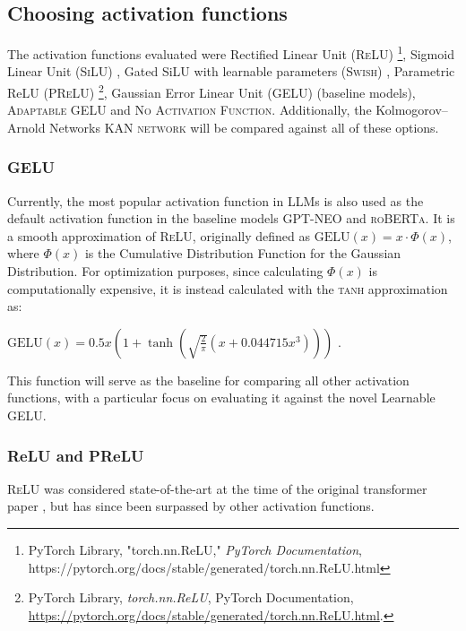 \subsection{Choosing activation functions}
The activation functions evaluated were Rectified Linear Unit (\textsc{ReLU}) \footnote{PyTorch Library, "torch.nn.ReLU," \textit{PyTorch Documentation}, https://pytorch.org/docs/stable/generated/torch.nn.ReLU.html}, Sigmoid Linear Unit (\textsc{SiLU}) \cite{Hendrycks2023}, Gated SiLU with learnable parameters (\textsc{Swish}) \cite{eger_is_2019}, Parametric ReLU (\textsc{PReLU}) \footnote{PyTorch Library, \textit{torch.nn.ReLU}, PyTorch Documentation, \url{https://pytorch.org/docs/stable/generated/torch.nn.ReLU.html}.}, Gaussian Error Linear Unit (\textsc{GELU}) (baseline models), \textsc{Adaptable GELU} and \textsc{No Activation Function}. Additionally, the Kolmogorov–Arnold Networks \textsc{KAN network} \cite{Liu2024} will be compared against all of these options.

\subsubsection{GELU}
Currently, the most popular activation function in LLMs is also used as the default activation function in the baseline models \textsc{GPT-NEO} and \textsc{roBERTa}. It is a smooth approximation of \textsc{ReLU}, originally defined as \(\text{GELU}(x) = x \cdot \Phi(x)\), where \(\Phi(x)\)
is the Cumulative Distribution Function for the Gaussian Distribution. For optimization purposes, since calculating \(\Phi(x)\) is computationally expensive, it is instead calculated with the \textsc{tanh} approximation as:

\(\text{GELU}(x) = 0.5x \left(1 + \tanh\left(\sqrt{\frac{2}{\pi}} \left(x + 0.044715x^3\right)\right)\right)\) \cite{Hendrycks2023}. 

This function will serve as the baseline for comparing all other activation functions, with a particular focus on evaluating it against the novel Learnable GELU.

\subsubsection{ReLU and PReLU}
\textsc{ReLU} was considered state-of-the-art at the time of the original transformer paper \cite{Vaswani2017}, but has since been surpassed by other activation functions.

